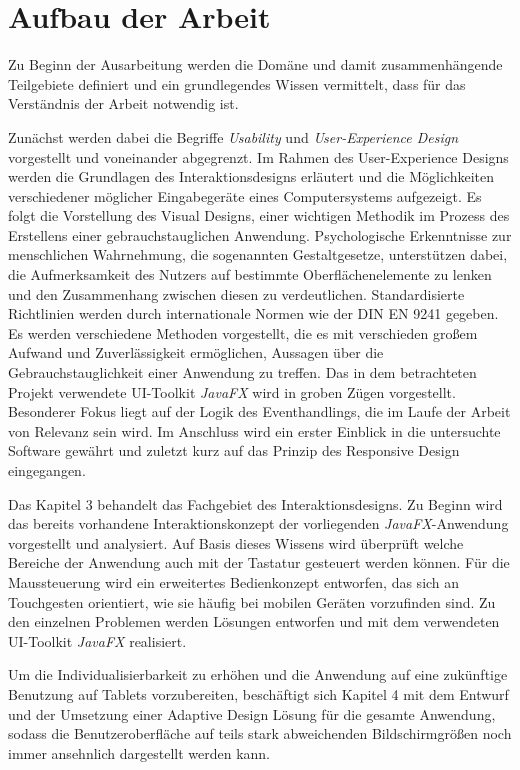\section{Aufbau der Arbeit} \label{sec:einlAufbau}
Zu Beginn der Ausarbeitung werden die Domäne und damit zusammenhängende Teilgebiete definiert und ein grundlegendes Wissen vermittelt, dass für das Verständnis der Arbeit notwendig ist.\par
Zunächst werden dabei die Begriffe \textit{Usability} und \textit{User-Experience Design} vorgestellt und voneinander abgegrenzt. Im Rahmen des User-Experience Designs werden die Grundlagen des Interaktionsdesigns erläutert und die Möglichkeiten verschiedener möglicher Eingabegeräte eines Computersystems aufgezeigt. Es folgt die Vorstellung des Visual Designs, einer wichtigen Methodik im Prozess des Erstellens einer gebrauchstauglichen Anwendung. Psychologische Erkenntnisse zur menschlichen Wahrnehmung, die sogenannten Gestaltgesetze, unterstützen dabei, die Aufmerksamkeit des Nutzers auf bestimmte Oberflächenelemente zu lenken und den Zusammenhang zwischen diesen zu verdeutlichen. Standardisierte Richtlinien werden durch internationale Normen wie der DIN EN 9241 gegeben. Es werden verschiedene Methoden vorgestellt, die es mit verschieden großem Aufwand und Zuverlässigkeit ermöglichen, Aussagen über die Gebrauchstauglichkeit einer Anwendung zu treffen. Das in dem betrachteten Projekt verwendete UI-Toolkit \textit{JavaFX} wird in groben Zügen vorgestellt. Besonderer Fokus liegt auf der Logik des Eventhandlings, die im Laufe der Arbeit von Relevanz sein wird. Im Anschluss wird ein erster Einblick in die untersuchte Software gewährt und zuletzt kurz auf das Prinzip des Responsive Design eingegangen.\par
Das Kapitel 3 behandelt das Fachgebiet des Interaktionsdesigns. Zu Beginn wird das bereits vorhandene Interaktionskonzept der vorliegenden \textit{JavaFX}-Anwendung vorgestellt und analysiert. Auf Basis dieses Wissens wird überprüft welche Bereiche der Anwendung auch mit der Tastatur gesteuert werden können. Für die Maussteuerung wird ein erweitertes Bedienkonzept entworfen, das sich an Touchgesten orientiert, wie sie häufig bei mobilen Geräten vorzufinden sind. Zu den einzelnen Problemen werden Lösungen entworfen und mit dem verwendeten UI-Toolkit \textit{JavaFX} realisiert.\par
Um die Individualisierbarkeit zu erhöhen und die Anwendung auf eine zukünftige Benutzung auf Tablets vorzubereiten, beschäftigt sich Kapitel 4 mit dem Entwurf und der Umsetzung einer Adaptive Design Lösung für die gesamte Anwendung, sodass die Benutzeroberfläche auf teils stark abweichenden Bildschirmgrößen noch immer ansehnlich dargestellt werden kann.\par
